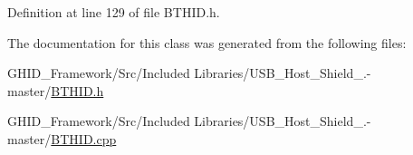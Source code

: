 \-Definition at line 129 of file \-B\-T\-H\-I\-D.\-h.



\-The documentation for this class was generated from the following files\-:\begin{DoxyCompactItemize}
\item 
\-G\-H\-I\-D\-\_\-\-Framework/\-Src/\-Included Libraries/\-U\-S\-B\-\_\-\-Host\-\_\-\-Shield\-\_.-\/master/\hyperlink{_b_t_h_i_d_8h}{\-B\-T\-H\-I\-D.\-h}\item 
\-G\-H\-I\-D\-\_\-\-Framework/\-Src/\-Included Libraries/\-U\-S\-B\-\_\-\-Host\-\_\-\-Shield\-\_.-\/master/\hyperlink{_b_t_h_i_d_8cpp}{\-B\-T\-H\-I\-D.\-cpp}\end{DoxyCompactItemize}
